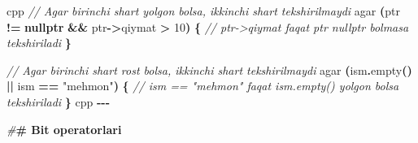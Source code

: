 \documentclass[a4paper,11pt,twoside,openright]{book}
\newenvironment{Shaded}{\begin{snugshade}}{\end{snugshade}}
\newcommand{\CommentTok}[1]{\textcolor[rgb]{0.56,0.35,0.01}{\textit{#1}}}
\newcommand{\DecValTok}[1]{\textcolor[rgb]{0.00,0.00,0.81}{#1}}
\newcommand{\ErrorTok}[1]{\textcolor[rgb]{0.64,0.00,0.00}{\textbf{#1}}}
\newcommand{\KeywordTok}[1]{\textcolor[rgb]{0.13,0.29,0.53}{\textbf{#1}}}
\newcommand{\NormalTok}[1]{#1}
\newcommand{\OperatorTok}[1]{\textcolor[rgb]{0.81,0.36,0.00}{\textbf{#1}}}
\newcommand{\PreprocessorTok}[1]{\textcolor[rgb]{0.56,0.35,0.01}{\textit{#1}}}
\newcommand{\StringTok}[1]{\textcolor[rgb]{0.31,0.60,0.02}{#1}}
\begin{document}
\begin{Shaded}
\begin{Highlighting}[]
\ErrorTok{\textasciigrave{}\textasciigrave{}\textasciigrave{}}\NormalTok{cpp}
\CommentTok{// Agar birinchi shart yolg\textquotesingle{}on bo\textquotesingle{}lsa, ikkinchi shart tekshirilmaydi}
\NormalTok{agar }\OperatorTok{(}\NormalTok{ptr }\OperatorTok{!=} \KeywordTok{nullptr} \OperatorTok{\&\&}\NormalTok{ ptr}\OperatorTok{{-}\textgreater{}}\NormalTok{qiymat }\OperatorTok{\textgreater{}} \DecValTok{10}\OperatorTok{)} \OperatorTok{\{}
    \CommentTok{// ptr{-}\textgreater{}qiymat faqat ptr nullptr bo\textquotesingle{}lmasa tekshiriladi}
\OperatorTok{\}}

\CommentTok{// Agar birinchi shart rost bo\textquotesingle{}lsa, ikkinchi shart tekshirilmaydi}
\NormalTok{agar }\OperatorTok{(}\NormalTok{ism}\OperatorTok{.}\NormalTok{empty}\OperatorTok{()} \OperatorTok{||}\NormalTok{ ism }\OperatorTok{==} \StringTok{"mehmon"}\OperatorTok{)} \OperatorTok{\{}
    \CommentTok{// ism == "mehmon" faqat ism.empty() yolg\textquotesingle{}on bo\textquotesingle{}lsa tekshiriladi}
\OperatorTok{\}}
\ErrorTok{\textasciigrave{}\textasciigrave{}\textasciigrave{}}\NormalTok{cpp}
\OperatorTok{{-}{-}{-}}

\PreprocessorTok{\#}\ErrorTok{\# Bit operatorlari}


\end{Highlighting}
\end{Shaded}
\end{document}

